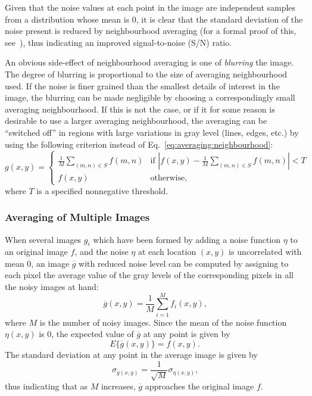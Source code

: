 Given that the noise values at each point in the image are independent
samples from a distribution whose mean is 0, it is clear that the
standard deviation of the noise present is reduced by neighbourhood
averaging (for a formal proof of this, see~\cite{digpic}), thus
indicating an improved signal-to-noise (S/N) ratio.

An obvious side-effect of neighbourhood averaging is one of {\em
  blurring\/} the image.  The degree of blurring is proportional to
the size of averaging neighbourhood used.  If the noise is finer
grained than the smallest details of interest in the image, the
blurring can be made negligible by choosing a correspondingly small
averaging neighbourhood.  If this is not the case, or if it for some
reason is desirable to use a larger averaging neighbourhood, the
averaging can be ``switched off'' in regions with large variations in
gray level (lines, edges, etc.) by using the following criterion
instead of Eq.~\ref{eq:averaging:neighbourhood}:
\begin{equation}
  g(x,y)=\left\{
    \begin{array}{ll}
      \frac{1}{M}\sum_{(m,n)\in S}f(m,n) &
        \mbox{if $\left|f(x,y)-\frac{1}{M}\sum_{(m,n)\in
            S}f(m,n)\right|<T$} \\
      f(x,y) & \mbox{otherwise,}
    \end{array}\right.
\end{equation}
where $T$ is a specified nonnegative threshold.

\subsubsection{Averaging of Multiple Images}

When several images $g_{i}$ which have been formed by adding a noise
function $\eta$ to an original image $f$, and the noise $\eta$ at each
location $(x,y)$ is uncorrelated with mean 0, an image $\overline{g}$
with reduced noise level can be computed by assigning to each pixel
the average value of the gray levels of the corresponding pixels in
all the noisy images at hand:
\begin{equation}
  \overline{g}(x,y)=\frac{1}{M}\sum_{i=1}^{M}f_{i}(x,y)\mbox{,}
\end{equation}
where $M$ is the number of noisy images.  Since the mean of the noise
function $\eta(x,y)$ is 0, the expected value of $\overline{g}$ at any
point is given by
\begin{equation}
  E\{\overline{g}(x,y)\}=f(x,y)\mbox{.}
\end{equation}
The standard deviation at any point in the average image is given by
\begin{equation}
  \sigma_{\overline{g}(x,y)}=\frac{1}{\sqrt{M}}\sigma_{\eta(x,y)}\mbox{,}
\end{equation}
thus indicating that as $M$ increases, $\overline{g}$ approaches the
original image $f$.

